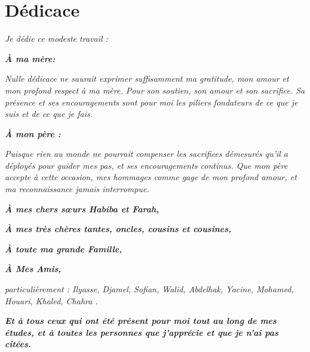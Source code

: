 \chapter*{Dédicace}
\begin{center}
	\textit{  Je dédie ce modeste travail :}
\end{center}
  \begin{center}
  	\textit{\textbf{ À ma mère:} }
  \end{center}
 \begin{center}
 	\textit{ Nulle dédicace ne saurait exprimer suffisamment ma gratitude, mon amour et mon profond respect à ma mère. Pour son soutien, son amour et son sacrifice. Sa présence et ses encouragements sont pour moi les piliers fondateurs de ce que je suis et de ce que je fais.}
 \end{center}
  \begin{center}
  	\textit{\textbf{À mon père :} }
  \end{center}
 \begin{center}
 	\textit{  Puisque rien au monde ne pourrait compenser les sacrifices démesurés qu’il a déployés pour guider mes pas, et ses encouragements continus. Que mon père accepte à cette occasion, mes hommages comme gage de mon profond amour, et ma reconnaissance jamais interrompue.}
 \end{center}
 
\begin{center}
	\textit{ \textbf{À mes chers sœurs Habiba et Farah,}}
\end{center}

\begin{center}
	\textit{\textbf{À mes très chères tantes, oncles, cousins et cousines,}}
\end{center}

\begin{center}
	\textit{ \textbf{À toute ma grande Famille,} }
\end{center}


\begin{center}
	\textit{ \textbf{À Mes Amis,} }
\end{center}

\begin{center}
	\textit{particulièrement :    Ilyasse, Djamel, Sofian, Walid, Abdelhak, Yacine, Mohamed,  Houari, Khaled, Chahra . }
\end{center}

\begin{center}
	\textit{\textbf{Et à tous ceux qui ont été présent pour moi tout au long de mes études, et à toutes les personnes que j’apprécie et que je n’ai pas citées.}}
\end{center}